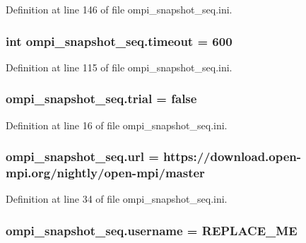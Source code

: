 Definition at line 146 of file ompi\-\_\-snapshot\-\_\-seq.\-ini.

\hypertarget{namespaceompi__snapshot__seq_a4a2554fd9d8c0df86eeaae67f5bc6867}{
\subsubsection[{timeout}]{\setlength{\rightskip}{0pt plus 5cm}int ompi\-\_\-snapshot\-\_\-seq.\-timeout = 600}}\label{namespaceompi__snapshot__seq_a4a2554fd9d8c0df86eeaae67f5bc6867}


Definition at line 115 of file ompi\-\_\-snapshot\-\_\-seq.\-ini.

\hypertarget{namespaceompi__snapshot__seq_a10070286ec527c9dfed8c210ca3917d7}{
\subsubsection[{trial}]{\setlength{\rightskip}{0pt plus 5cm}ompi\-\_\-snapshot\-\_\-seq.\-trial = false}}\label{namespaceompi__snapshot__seq_a10070286ec527c9dfed8c210ca3917d7}


Definition at line 16 of file ompi\-\_\-snapshot\-\_\-seq.\-ini.

\hypertarget{namespaceompi__snapshot__seq_a0af6b7793981b72fee25ffd1d077fd86}{
\subsubsection[{url}]{\setlength{\rightskip}{0pt plus 5cm}ompi\-\_\-snapshot\-\_\-seq.\-url = https\-://download.\-open-\/mpi.\-org/nightly/open-\/mpi/master}}\label{namespaceompi__snapshot__seq_a0af6b7793981b72fee25ffd1d077fd86}


Definition at line 34 of file ompi\-\_\-snapshot\-\_\-seq.\-ini.

\hypertarget{namespaceompi__snapshot__seq_ad73553bb8a0851422895d9c7e8978b83}{
\subsubsection[{username}]{\setlength{\rightskip}{0pt plus 5cm}ompi\-\_\-snapshot\-\_\-seq.\-username = R\-E\-P\-L\-A\-C\-E\-\_\-\-M\-E}}\label{namespaceompi__snapshot__seq_ad73553bb8a0851422895d9c7e8978b83}


